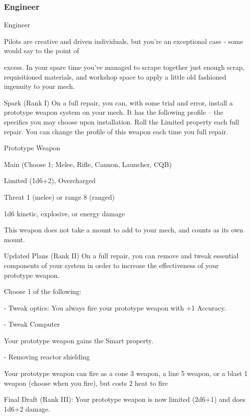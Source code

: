 \subsubsection{Engineer}

                                                   Engineer

Pilots are creative and driven individuals, but you’re an exceptional case - some would say to the point of

excess. In your spare time you’ve managed to scrape together just enough scrap, requisitioned materials,
and workshop space to apply a little old fashioned ingenuity to your mech.

Spark (Rank I)
On a full repair, you can, with some trial and error, install a prototype weapon system on your
mech. It has the following profile -- the specifics you may choose upon installation. Roll the
Limited property each full repair. You can change the profile of this weapon each time you full
repair.

         Prototype Weapon

         Main (Choose 1; Melee, Rifle, Cannon, Launcher, CQB)

         Limited (1d6+2), Overcharged

         Threat 1 (melee) or range 8 (ranged)

         1d6 kinetic, explosive, or energy damage

This weapon does not take a mount to add to your mech, and counts as its own mount.

Updated Plans  (Rank II)
On a full repair, you can remove and tweak essential components of your system in order to
increase the effectiveness of your prototype weapon.

Choose 1 of the following:

  - Tweak optics:
         You always fire your prototype weapon with +1 Accuracy.

  - Tweak Computer





         Your prototype weapon gains the Smart property.

  - Removing reactor shielding

         Your prototype weapon can fire as a cone 3 weapon, a line 5 weapon, or a blast 1
         weapon (choose when you fire), but costs 2 heat to fire

Final Draft (Rank III): Your prototype weapon is now limited (2d6+1) and does 1d6+2 damage.
